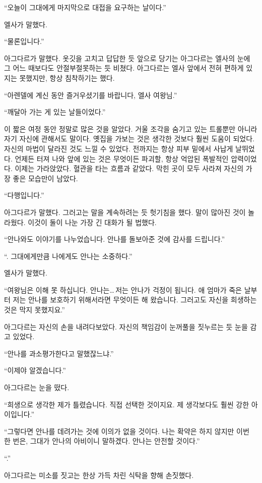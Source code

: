 ``오늘이 그대에게 마지막으로 대접을 요구하는 날이다.''

엘사가 말했다.

``물론입니다.''

아그다르가 말했다. 옷깃을 고치고 답답한 듯 앞으로 당기는 아그다르는 엘사의 눈에 그 어느 때보다도 안절부절못하는 듯 비쳤다. 아그다르는 엘사 앞에서 전혀 편하게 있지는 못했지만, 항상 침착하기는 했다.

``아렌델에 계신 동안 즐거우셨기를 바랍니다, 엘사 여왕님.''

``깨달아 가는 게 있는 날들이었다.''

이 짧은 여정 동안 정말로 많은 것을 알았다. 거울 조각을 숨기고 있는 트롤뿐만 아니라 자기 자신에 관해서도 말이다. 옛집을 가보는 것은 생각한 것보다 훨씬 도움이 되었다. 자신의 마법이 달라진 것도 느낄 수 있었다. 전까지는 항상 피부 밑에서 사납게 날뛰었다. 언제든 터져 나와 앞에 있는 것은 무엇이든 파괴할, 항상 억압된 폭발적인 압력이었다. 이제는 가라앉았다. 혈관을 타는 흐름과 같았다. 막힌 곳이 모두 사라져 자신의 가장 좋은 모습만이 남았다.

``다행입니다.''

아그다르가 말했다. 그러고는 말을 계속하려는 듯 헛기침을 했다. 말이 많아진 것이 놀라웠다. 이것이 둘이 나눈 가장 긴 대화가 될 법했다.

``안나와도 이야기를 나누었습니다. 안나를 돌보아준 것에 감사를 드립니다.''

``. 그대에게만큼 나에게도 안나는 소중하다.''

엘사가 말했다.

``여왕님은 이해 못 하십니다. 안나는\ldots\,저는 안나가 걱정이 됩니다. 애 엄마가 죽은 날부터 저는 안나를 보호하기 위해서라면 무엇이든 해 왔습니다. 그러고도 자신을 희생하는 것은 막지 못했지요.''

아그다르는 자신의 손을 내려다보았다. 자신의 책임감이 눈꺼풀을 짓누르는 듯 눈을 감고 있었다.

``안나를 과소평가한다고 말했잖느냐.''

``이제야 알겠습니다.''

아그다르는 눈을 떴다.

``희생으로 생각한 제가 틀렸습니다. 직접 선택한 것이지요. 제 생각보다도 훨씬 강한 아이입니다.''

``그렇다면 안나를 데려가는 것에 이의가 없을 것이다. 나는 확약은 하지 않지만 이번 한 번은, 그대가 안나의 아비이니 말하겠다. 안나는 안전할 것이다.''

``.''

아그다르는 미소를 짓고는 한상 가득 차린 식탁을 향해 손짓했다.

